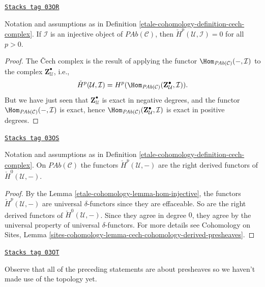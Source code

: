 \begin{lemma}
\label{etale-cohomology-lemma-hom-injective}
\href{https://stacks.math.columbia.edu/tag/03OR}{\texttt{Stacks tag 03OR}}

Notation and assumptions as in Definition \ref{etale-cohomology-definition-cech-complex}.
If $\mathcal{I}$ is an injective object of $\textit{PAb}(\mathcal{C})$,
then $\check H^p(\mathcal{U}, \mathcal{I}) = 0$ for all $p > 0$.
\end{lemma}

\begin{proof}
The {\v C}ech complex is the result of applying the functor
$\Hom_{\textit{PAb}(\mathcal{C})}(-, \mathcal{I}) $ to the complex $
\mathbf{Z}^\bullet_\mathcal{U} $, i.e.,
$$
\check H^p(\mathcal{U}, \mathcal{I}) = H^p
(\Hom_{\textit{PAb}(\mathcal{C})} (\mathbf{Z}^\bullet_\mathcal{U},
\mathcal{I})).
$$
But we have just seen that $\mathbf{Z}^\bullet_\mathcal{U}$ is exact in
negative degrees, and the functor $\Hom_{\textit{PAb}(\mathcal{C})}(-,
\mathcal{I})$ is exact, hence $\Hom_{\textit{PAb}(\mathcal{C})}
(\mathbf{Z}^\bullet_\mathcal{U}, \mathcal{I})$ is exact in positive degrees.
\end{proof}

\begin{theorem}
\label{etale-cohomology-theorem-cech-derived}
\href{https://stacks.math.columbia.edu/tag/03OS}{\texttt{Stacks tag 03OS}}

Notation and assumptions as in Definition \ref{etale-cohomology-definition-cech-complex}.
On $\textit{PAb}(\mathcal{C})$ the functors $\check{H}^p(\mathcal{U}, -)$ are
the right derived functors of $\check{H}^0(\mathcal{U}, -)$.
\end{theorem}

\begin{proof}
By the Lemma \ref{etale-cohomology-lemma-hom-injective}, the functors
$\check H^p(\mathcal{U}, -)$ are universal
$\delta$-functors since they are effaceable.
So are the right derived functors of $\check H^0(\mathcal{U}, -)$. Since they
agree in degree $0$, they agree by the universal property of universal
$\delta$-functors. For more details see
Cohomology on Sites,
Lemma \ref{sites-cohomology-lemma-cech-cohomology-derived-presheaves}.
\end{proof}

\begin{remark}
\label{etale-cohomology-remark-presheaves-no-topology}
\href{https://stacks.math.columbia.edu/tag/03OT}{\texttt{Stacks tag 03OT}}

Observe that all of the preceding statements are about presheaves so we haven't
made use of the topology yet.
\end{remark}

